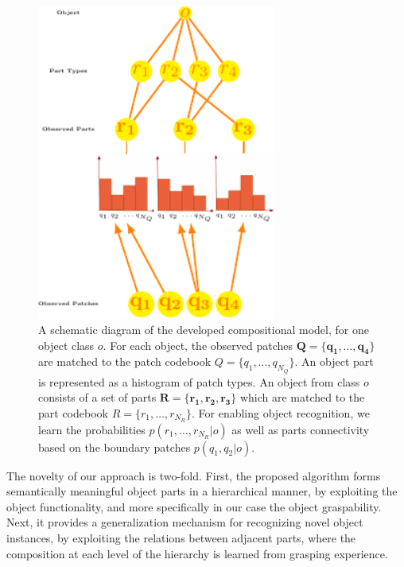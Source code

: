 \documentclass[a4paper,11pt,pdf]{pacmanreport}
\begin{document}
\begin{figure}[h!]
\begin{center}
\includegraphics[width=0.7\textwidth]{rel.pdf}
\end{center}
\caption{A schematic diagram of the developed compositional model, for one object class $o$. For each object, the observed patches $\mathbf{Q}=\{\mathbf{q_1},\ldots,\mathbf{q_4}\}$ are matched to the patch codebook $Q=\{q_1,\ldots,q_{N_{Q}}\}$. An object part is represented as a histogram of patch types. An object from class $o$ consists of a set of parts $\mathbf{R}=\{\mathbf{r_1},\mathbf{r_2},\mathbf{r_3}\}$ which are matched to the part codebook $R=\{r_1,\ldots,r_{N_{R}}\}$. For enabling object recognition, we learn the probabilities $p(r_1,\ldots,r_{N_{R}} \vert o)$ as well as parts connectivity based on the boundary patches $p(q_{1},q_{2} \vert o)$.} 
\label{fig:rel}
\end{figure}

The novelty of our approach is two-fold. First, the proposed algorithm forms semantically meaningful object parts in a hierarchical manner, by exploiting the object functionality, and more specifically in our case the object graspability. Next, it provides a generalization mechanism for recognizing novel object instances, by exploiting the relations between adjacent parts, where the composition at each level of the hierarchy is learned from grasping experience.
\end{document}
